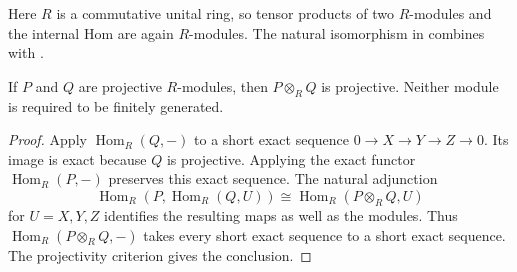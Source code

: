Here $R$ is a commutative unital ring, so tensor products of two $R$-modules and the internal Hom are again $R$-modules. The natural isomorphism in  combines with .

\begin{proposition}\label{prop-tensor-projectives}
If $P$ and $Q$ are projective $R$-modules, then $P\otimes_RQ$ is projective. Neither module is required to be finitely generated.
\end{proposition}
\begin{proof}\label{proof-tensor-projectives}
Apply $\operatorname{Hom}_R(Q,-)$ to a short exact sequence $0\to X\to Y\to Z\to0$. Its image is exact because $Q$ is projective. Applying the exact functor $\operatorname{Hom}_R(P,-)$ preserves this exact sequence. The natural adjunction
\[
\operatorname{Hom}_R(P,\operatorname{Hom}_R(Q,U))
\cong\operatorname{Hom}_R(P\otimes_RQ,U)
\]
for $U=X,Y,Z$ identifies the resulting maps as well as the modules. Thus $\operatorname{Hom}_R(P\otimes_RQ,-)$ takes every short exact sequence to a short exact sequence. The projectivity criterion gives the conclusion.
\end{proof}
